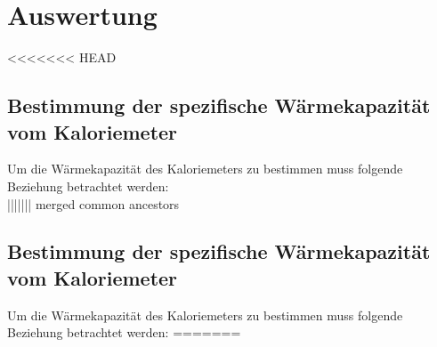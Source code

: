 \section{Auswertung}
\label{sec:Auswertung}
<<<<<<< HEAD
\subsection{Bestimmung der spezifische Wärmekapazität vom Kaloriemeter}
Um die Wärmekapazität des Kaloriemeters zu bestimmen muss folgende Beziehung betrachtet werden:\\
||||||| merged common ancestors
\subsection{Bestimmung der spezifische Wärmekapazität vom Kaloriemeter}
Um die Wärmekapazität des Kaloriemeters zu bestimmen muss folgende Beziehung betrachtet werden:
=======
